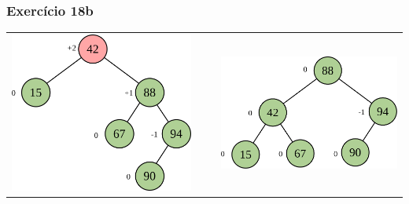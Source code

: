 \documentclass[aspectratio=169]{beamer}
\begin{document}
\begin{frame}[fragile]\frametitle{Exercício 18b}
\begin{tabular}{lll}
\includegraphics[height=0.45\paperheight]{imagens/avl16c.png} & ~ ~ &
\includegraphics[height=0.33\paperheight]{imagens/avl16d.png} \\
\end{tabular}
\end{frame}
\end{document}
